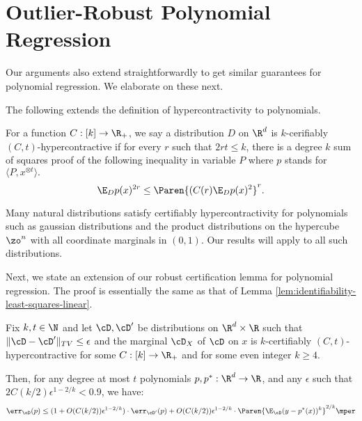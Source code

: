 \section{Outlier-Robust Polynomial Regression}\label{sec:app-moved}

Our arguments also extend straightforwardly to get similar guarantees for polynomial regression. We elaborate on these next.

The following extends the definition of hypercontractivity to polynomials.

\begin{definition}\label{def:hyperconc2}
For a function $C:[k] \to \R_+$, we say a distribution $D$ on $\R^d$ is $k$-cerifiably $(C,t)$-hypercontractive if for every $r$ such that $2r t \leq k$, there is a degree $k$ sum of squares proof of the following inequality in variable $P$ where $p$ stands for $\langle P,x^{\otimes t}\rangle.$
\[
\E_D p(x)^{2r} \leq \Paren{(C(r) \E_{D} p(x)^{2}}^{r}.
\] 
\end{definition}
Many natural distributions satisfy certifiably hypercontractivity \citep{DBLP:conf/soda/KauersOTZ14} for polynomials such as gaussian distributions and the product distributions on the hypercube $\zo^n$ with all coordinate marginals in $(0,1)$. Our results will apply to all such distributions. 

Next, we state an extension of our robust certification lemma for polynomial regression. The proof is essentially the same as that of Lemma \ref{lem:identifiability-least-squares-linear}. 
\begin{lemma}
Fix $k,t \in \N$ and let $\cD,\cD'$ be distributions on $\R^d \times \R$ such that $\|\cD-\cD'\|_{TV} \leq \epsilon$ and the marginal $\cD_X$ of $\cD$ on $x$ is $k$-certifiably $(C,t)$-hypercontractive for some $C:[k] \to \R_+$ and for some even integer $k \geq 4$.

Then, for any degree at most $t$ polynomials $p,p^*:\R^d \to \R$, and any $\epsilon$ such that $2 C(k/2) \epsilon^{1-2/k} < 0.9$, we have:
\[
\err_{\cD}(p) \leq (1+O(C(k/2)) \epsilon^{1-2/k}) \cdot \err_{\cD'}(p) + O(C(k/2))\epsilon^{1-2/k} \cdot \Paren{\E_\cD (y-p^*(x))^k}^{2/k}\mper\]\label{lem:identifiability-least-squares-polynomial}
\end{lemma}



